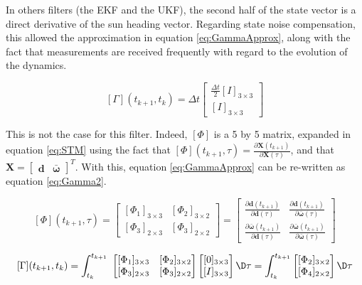\documentclass[]{BasiliskReportMemo}
\begin{document}
In others filters (the EKF and the UKF), the second half of the state vector is a direct derivative of the sun heading vector. Regarding state noise compensation, this allowed the approximation in equation \eqref{eq:GammaApprox}, along with the fact that measurements are received frequently with regard to the evolution of the dynamics.

\begin{equation}\label{eq:GammaApprox}
  [\Gamma](t_{k+1}, t_k) =\Delta t \begin{bmatrix} \frac{\Delta t}{2}[I]_{3 \times 3} \\ [I]_{3 \times 3}\end{bmatrix}
\end{equation}

This is not the case for this filter. Indeed, $[\Phi]$ is a 5 by 5 matrix, expanded in equation \eqref{eq:STM} using the fact that $[\Phi](t_{k+1}, \tau) = \frac{\partial \bm X(t_{k+1})}{\partial \bm X(\tau)}$, and that $\bm X = \begin{bmatrix} \bm d & \bar{\bm \omega} \end{bmatrix}^T$. With this, equation \eqref{eq:GammaApprox} can be re-written as equation \eqref{eq:Gamma2}.

\begin{equation}\label{eq:STM}
[\Phi](t_{k+1}, \tau) =    \begin{bmatrix} [\Phi_{1}]_{3\times 3} &  [\Phi_2]_{3 \times 2} \\  [\Phi_3]_{2 \times 3} &  [\Phi_3]_{2 \times 2}\end{bmatrix}=   \begin{bmatrix} \frac{\partial \bm d (t_{k+1})}{\partial \bm d(\tau)} &   \frac{\partial \bm d (t_{k+1})}{\partial \bar{\bm \omega}(\tau)} \\  \frac{\partial \bar{\bm \omega}(t_{k+1})}{\partial \bm d(\tau)} &   \frac{\partial \bar{\bm \omega}(t_{k+1})}{\partial \bar{\bm \omega}(\tau)} \end{bmatrix}
\end{equation}

\begin{equation}\label{eq:Gamma2}
[\Gamma](t_{k+1}, t_k) = \int_{t_k}^{t_{k+1}}  \ \begin{bmatrix} [\Phi_{1}]_{3\times 3} &  [\Phi_2]_{3 \times 2} \\  [\Phi_3]_{2 \times 3} &  [\Phi_3]_{2 \times 2}\end{bmatrix}\begin{bmatrix} [0]_{3 \times 3} \\ [I]_{3 \times 3}\end{bmatrix} \D \tau =  \int_{t_k}^{t_{k+1}}  \begin{bmatrix} [\Phi_2]_{3 \times 2} \\    [\Phi_4]_{2 \times 2}\end{bmatrix} \D \tau 
\end{equation}
\end{document}
